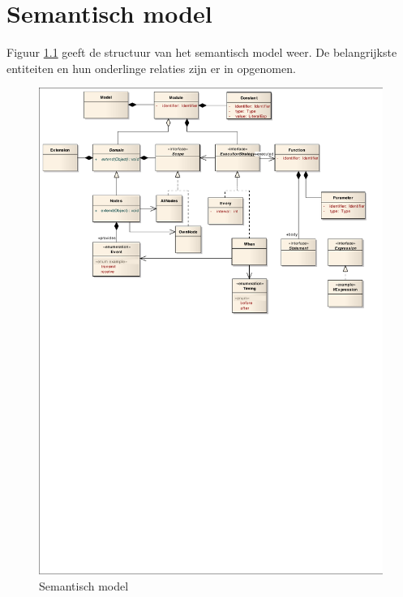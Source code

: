 
\chapter{Semantisch model}
\label{appendix:semantic-model}

Figuur \ref{fig:arch-semantic-model} geeft de structuur van het semantisch
model weer. De belangrijkste entiteiten en hun onderlinge relaties zijn er in
opgenomen.

\vspace{1cm}

\begin{figure}[ht]
  \centering
  \includegraphics[width=\linewidth]{resources/semantic.pdf}
  \caption{Semantisch model}
  \label{fig:arch-semantic-model}
\end{figure}
